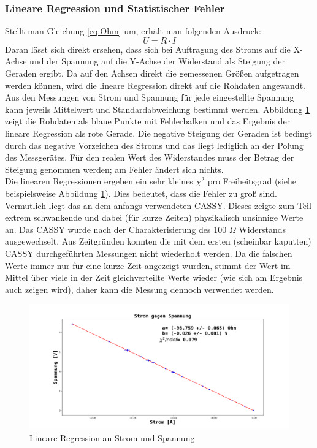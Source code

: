 \documentclass[12pt,a4paper]{article}
\begin{document}
\subsubsection{Lineare Regression und Statistischer Fehler}
Stellt man Gleichung \ref{eq:Ohm} um, erhält man folgenden Ausdruck:
\begin{equation}
U = R \cdot I
\end{equation}
Daran lässt sich direkt ersehen, dass sich bei Auftragung des Stroms auf die X-Achse und der Spannung auf die Y-Achse der Widerstand als Steigung der Geraden ergibt. Da auf den Achsen direkt die gemessenen Größen aufgetragen werden können, wird die lineare Regression direkt auf die Rohdaten angewandt. \\
Aus den Messungen von Strom und Spannung für jede eingestellte Spannung kann jeweils Mittelwert und Standardabweichung bestimmt werden. Abbildung \ref{fig:Widerstand_lineare_Regression} zeigt die Rohdaten als blaue Punkte mit Fehlerbalken und das Ergebnis der lineare Regression als rote Gerade. Die negative Steigung der Geraden ist bedingt durch das negative Vorzeichen des Stroms und das liegt lediglich an der Polung des Messgerätes. Für den realen Wert des Widerstandes muss der Betrag der Steigung genommen werden; am Fehler ändert sich nichts. \\
Die linearen Regressionen ergeben ein sehr kleines $\chi^2$ pro Freiheitsgrad (siehe beispielsweise Abbildung \ref{fig:Widerstand_lineare_Regression}). Dies bedeutet, dass die Fehler zu groß sind. Vermutlich liegt das an dem anfangs verwendeten CASSY. Dieses zeigte zum Teil extrem schwankende und dabei (für kurze Zeiten) physikalisch unsinnige Werte an. Das CASSY wurde nach der Charakterisierung des 100 $\Omega$ Widerstands ausgewechselt. Aus Zeitgründen konnten die mit dem ersten (scheinbar kaputten) CASSY durchgeführten Messungen nicht wiederholt werden. Da die falschen Werte immer nur für eine kurze Zeit angezeigt wurden, stimmt der Wert im Mittel über viele in der Zeit gleichverteilte Werte wieder (wie sich am Ergebnis auch zeigen wird), daher kann die Messung dennoch verwendet werden.
\begin{figure}
\begin{center}
\includegraphics[scale=0.45]{Bilder/Widerstand_Fit.png}
\end{center}
\caption[Widerstand Lineare Regression]{Lineare Regression an Strom und Spannung}
\label{fig:Widerstand_lineare_Regression}
\end{figure}
\end{document}
